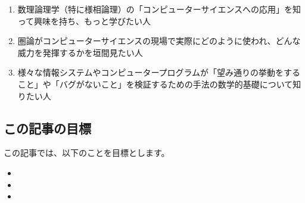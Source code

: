 \documentclass[
		head_space=20mm,
		foot_space=20mm,
		gutter=10mm,
		line_length=190mm
]{jlreq}
\begin{document}
\begin{enumerate}
	\item 数理論理学（特に様相論理）の「コンピューターサイエンスへの応用」を知って興味を持ち、もっと学びたい人
	\item 圏論がコンピューターサイエンスの現場で実際にどのように使われ、どんな威力を発揮するかを垣間見たい人
	\item 様々な情報システムやコンピュータープログラムが「望み通りの挙動をすること」や「バグがないこと」を検証するための手法の数学的基礎について知りたい人
\end{enumerate}

\subsection*{この記事の目標}

\noindent この記事では、以下のことを目標とします。

\begin{itemize}
	\item 
	\item 
	\item 
\end{itemize}

		


\end{document}
